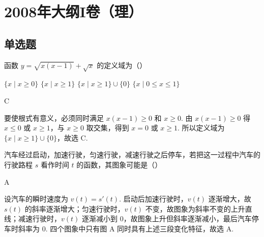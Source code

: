 
\chapter{2008年大纲I卷（理）}

\section{单选题}

\begin{problem}
函数 \( y = \sqrt{x(x - 1)} + \sqrt{x} \) 的定义域为（\quad）

\choices
    {\( \{x \mid x \geqslant 0\} \)}
    {\(\{x\mid x\geqslant 1\}\)}
    {\(\{x\mid x\geqslant 1\} \cup \{0\}\)}
    {\(\{x\mid 0\leqslant x\leqslant 1\}\)}
\end{problem}

\begin{answer}
C
\end{answer}

\begin{solution}
要使根式有意义，必须同时满足 \(x(x-1)\geqslant 0\) 和 \(x\geqslant 0\). 由 \(x(x-1)\geqslant 0\) 得 \(x\leqslant 0\) 或 \(x\geqslant 1\)，与 \(x\geqslant 0\) 取交集，得到 \(x=0\) 或 \(x\geqslant 1\). 所以定义域为 \(\{x\mid x\geqslant 1\}\cup\{0\}\)，故选 C.
\end{solution}

\begin{problem}
汽车经过启动，加速行驶，匀速行驶，减速行驶之后停车，若把这一过程中汽车的行驶路程 \(s\) 看作时间 \(t\) 的函数，其图象可能是（\quad）

    {}
    {}
    {}
\end{problem}

\begin{answer}
A
\end{answer}

\begin{solution}
设汽车的瞬时速度为 \(v(t)=s'(t)\). 启动后加速行驶时，\(v(t)\) 逐渐增大，故 \(s(t)\) 的斜率逐渐增大；匀速行驶时，\(v(t)\) 不变，故图象为斜率不变的上升直线；减速行驶时，\(v(t)\) 逐渐减小到 \(0\)，故图象上升但斜率逐渐减小，最后汽车停车时斜率为 \(0\). 四个图象中只有图 A 同时具有上述三段变化特征，故选 A.
\end{solution}

